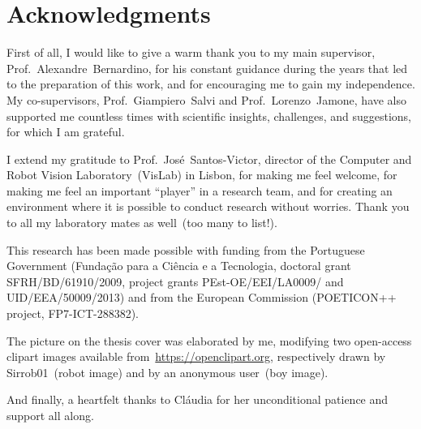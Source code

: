 
\chapter{Acknowledgments}

First of all, I would like to give a warm thank you to my main supervisor, Prof.~Alexandre~Bernardino, for his constant guidance during the years that led to the preparation of this work, and for encouraging me to gain my independence. My co-supervisors, Prof.~Giampiero~Salvi and Prof.~Lorenzo~Jamone, have also supported me countless times with scientific insights, challenges, and suggestions, for which I am grateful.

I extend my gratitude to Prof.~José~Santos-Victor, director of the Computer and Robot Vision Laboratory~(VisLab) in Lisbon, for making me feel welcome, for making me feel an important ``player'' in a research team, and for creating an environment where it is possible to conduct research without worries. Thank you to all my laboratory mates as well~(too many to list!).

This research has been made possible with funding from the Portuguese Government (Fundação para a Ciência e a Tecnologia, doctoral grant SFRH/BD/61910/2009, project grants PEst-OE/EEI/LA0009/ and UID/EEA/50009/2013) and from the European Commission (POETICON++ project, FP7-ICT-288382).

The picture on the thesis cover was elaborated by me, modifying two open-access clipart images available from~\url{https://openclipart.org}, respectively drawn by Sirrob01~(robot image) and by an anonymous user~(boy image).

\bigskip

And finally, a heartfelt thanks to Cláudia for her unconditional patience and support all along.
